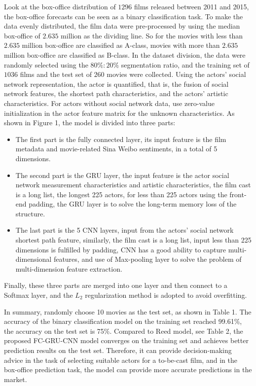 \documentclass[review]{cvpr}
\begin{document}
Look at the box-office distribution of $1296$ films released between 2011 and 2015,
the box-office forecasts can be seen as a binary classification task.
To make the data evenly distributed, the film data were pre-processed by using the median box-office of $2.635$ million as the dividing line.
So for the movies with less than $2.635$ million box-office are classified as A-class, movies with more than $2.635$ million box-office are classified as B-class.
In the dataset division, the data were randomly selected using the $80\%:20\%$ segmentation ratio, and the training set of $1036$ films and the test set of $260$ movies were collected.
Using the actors' social network representation, the actor is quantified, that is,
the fusion of social network features, the shortest path characteristics, and the actors' artistic characteristics.
For actors without social network data, use zero-value initialization in the actor feature matrix for the unknown characteristics.
As shown in Figure 1, the model is divided into three parts:

\begin{itemize}
\item The first part is the fully connected layer, its input feature is the film metadata and movie-related Sina Weibo sentiments, in a total of 5 dimensions.
\item The second part is the GRU layer, the input feature is the actor social network measurement characteristics and artistic characteristics, the film cast is a long list,
the longest 225 actors, for less than 225 actors using the front-end padding, the GRU layer is to solve the long-term memory loss of the structure.
\item The last part is the 5 CNN layers, input from the actors' social network shortest path feature, similarly, the film cast is a long list,
input less than 225 dimensions is fulfilled by padding, CNN has a good ability to capture multi-dimensional features, and use of Max-pooling layer to solve the problem of multi-dimension feature extraction.
\end{itemize}
Finally, these three parts are merged into one layer and then connect to a Softmax layer, and the $L_2$ regularization method is adopted to avoid overfitting.


In summary, randomly choose 10 movies as the test set, as shown in Table 1.
The accuracy of the binary classification model on the training set reached 99.61\%, the accuracy on the test set is 75\%.
Compared to Reed \etal model, see Table 2, the proposed FC-GRU-CNN model converges on the training set and achieves better prediction results on the test set.
Therefore, it can provide decision-making advice in the task of selecting suitable actors for a to-be-cast film,
and in the box-office prediction task, the model can provide more accurate predictions in the market.
\end{document}
